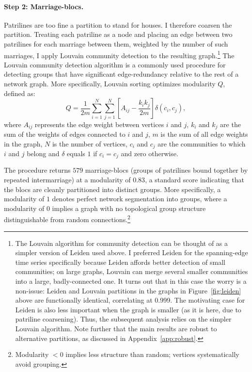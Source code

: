 \documentclass[12pt]{article}
\theoremstyle{definition}
\theoremstyle{remark}
\begin{document}
\paragraph{Step 2: Marriage-blocs.} Patrilines are too fine a partition to stand for houses. I therefore coarsen the partition. Treating each patriline as a node and placing an edge between two patrilines for each marriage between them, weighted by the number of such marriages, I apply Louvain community detection \citep{blondel_2008} to the resulting graph.\footnote{The Louvain algorithm for community detection can be thought of as a simpler version of Leiden used above. I preferred Leiden for the spanning-edge time series specifically because Leiden affords better detection of small communities; on large graphs, Louvain can merge several smaller communities into a large, badly-connected one. It turns out that in this case the worry is a non-issue: Leiden and Louvain partitions in the graphs in Figure~\ref{fig:leiden} above are functionally identical, correlating at 0.999. The motivating case for Leiden is also less important when the graph is smaller (as it is here, due to patriline coarsening). Thus, the subsequent analysis relies on the simpler Louvain algorithm. Note further that the main results are robust to alternative partitions, as discussed in Appendix~\ref{app:robust}.} The Louvain community detection algorithm is a commonly used procedure for detecting groups that have significant edge-redundancy relative to the rest of a network graph. More specifically, Louvain sorting optimizes modularity $Q$, defined as:
\begin{equation*}
  Q = \frac{1}{2m} \sum_{i=1}^{N} \sum_{j=1}^{N}
      \left[ A_{ij} - \frac{k_i k_j}{2m} \right] \delta(c_i, c_j),
  \label{eq:modularity}
\end{equation*}
where $A_{ij}$ represents the edge weight between vertices $i$ and $j$, $k_i$ and $k_j$ are the sum of the weights of edges connected to $i$ and $j$, $m$ is the sum of all edge weights in the graph, $N$ is the number of vertices, $c_i$ and $c_j$ are the communities to which $i$ and $j$ belong and $\delta$ equals $1$ if $c_i = c_j$ and zero otherwise.

The procedure returns $579$ marriage-blocs (groups of patrilines bound together by repeated intermarriage) at a modularity of $0.83$, a standard score indicating that the blocs are cleanly partitioned into distinct groups. More specifically, a modularity of $1$ denotes perfect network segmentation into groups, where a modularity of $0$ implies a graph with no topological group structure distinguishable from random connections.\footnote{Modularity $<0$ implies less structure than random; vertices systematically avoid grouping.}
\end{document}
